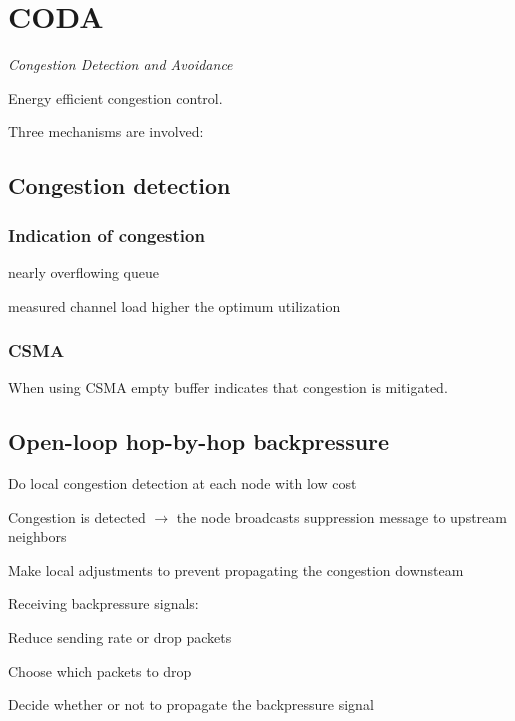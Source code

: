 \section{CODA} 
\emph{Congestion Detection and Avoidance}

Energy efficient congestion control.

Three mechanisms are involved:
\subsection{Congestion detection}

\subsubsection{Indication of congestion}
\begin{description} 
	\item nearly overflowing queue
	\item measured channel load higher the optimum utilization
\end{description}

\subsubsection{CSMA}
When using CSMA empty buffer indicates that congestion is mitigated.


\subsection{Open-loop hop-by-hop backpressure}

\begin{description}
	\item Do local congestion detection at each node with low cost
	\item Congestion is detected $\rightarrow$ the node broadcasts suppression
		message to upstream neighbors
	\item Make local adjustments to prevent propagating the congestion
		downsteam
\end{description}

Receiving backpressure signals:
\begin{description}
	\item Reduce sending rate or drop packets
	\item Choose which packets to drop
	\item Decide whether or not to propagate the backpressure signal
\end{description}

